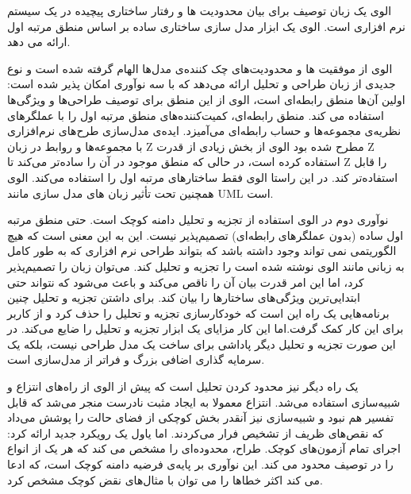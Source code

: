 الوی یک زبان توصیف برای بیان محدودیت ها و رفتار ساختاری پیچیده در یک سیستم نرم افزاری است. الوی یک ابزار مدل سازی ساختاری ساده بر اساس منطق مرتبه اول ارائه می دهد. 

الوی از موفقیت ها و محدودیت‌های چک کننده‌ی مدل‌ها الهام گرفته شده است و نوع جدیدی از زبان طراحی و تحلیل ارائه می‌دهد که با سه نوآوری امکان پذیر شده‌ است:
 اولین آن‌ها منطق رابطه‌ای است، الوی از این منطق برای توصیف طراحی‌ها و ویژگی‌ها استفاده می کند. منطق رابطه‌ای، کمیت‌کننده‌های منطق مرتبه اول را با عملگرهای نظریه‌ی مجموعه‌ها و حساب رابطه‌ای می‌آمیزد. ایده‌ی مدل‌سازی طرح‌های نرم‌افزاری با مجموعه‌ها و روابط در زبان Z مطرح شده بود الوی از بخش زیادی از قدرت Z استفاده کرده است، در حالی که منطق موجود در آن را ساده‌تر می‌کند تا Z را قابل استفاده‌تر کند. در این راستا الوی فقط ساختارهای مرتبه اول را استفاده می‌کند. الوی همچنین تحت تأثیر زبان های مدل سازی مانند UML است.

 نوآوری دوم در الوی استفاده از تجزیه و تحلیل دامنه کوچک است. حتی منطق مرتبه اول ساده (بدون عملگرهای رابطه‌ای) تصمیم‌پذیر نیست. این به این معنی است که هیچ الگوریتمی نمی تواند وجود داشته باشد که بتواند طراحی نرم افزاری که به طور کامل به زبانی مانند الوی نوشته شده است را تجزیه و تحلیل کند. می‌توان زبان را تصمیم‌پذیر کرد، اما این امر قدرت بیان آن را ناقص می‌کند و باعث می‌شود که نتواند حتی ابتدایی‌ترین ویژگی‌های ساختارها را بیان کند. برای داشتن تجزیه و تحلیل چنین برنامه‌هایی یک راه این است که خودکارسازی تجزیه و تحلیل را حذف کرد و از کاربر برای این کار کمک گرفت.اما این کار مزایای یک ابزار تجزیه و تحلیل را ضایع می‌کند. در این صورت تجزیه و تحلیل دیگر پاداشی برای ساخت یک مدل طراحی نیست، بلکه یک سرمایه گذاری اضافی بزرگ و فراتر از مدل‌سازی است.

یک راه دیگر نیز محدود کردن تحلیل است که پیش از الوی از راه‌های انتزاع و شبیه‌سازی استفاده می‌شد. انتزاع معمولا به ایجاد مثبت نادرست منجر می‌شد که قابل تفسیر هم نبود و شبیه‌سازی نیز آنقدر بخش کوچکی از فضای حالت را پوشش می‌داد که نقص‌های ظریف از تشخیص فرار می‌کردند. اما یاول یک رویکرد جدید ارائه کرد: اجرای تمام آزمون‌های کوچک. طراح، محدوده‌ای را مشخص می کند که هر یک از انواع را در توصیف محدود می کند. این نوآوری بر پایه‌ی فرضیه دامنه کوچک است، که ادعا می کند اکثر خطاها را می توان با مثال‌های نقض کوچک مشخص کرد.

